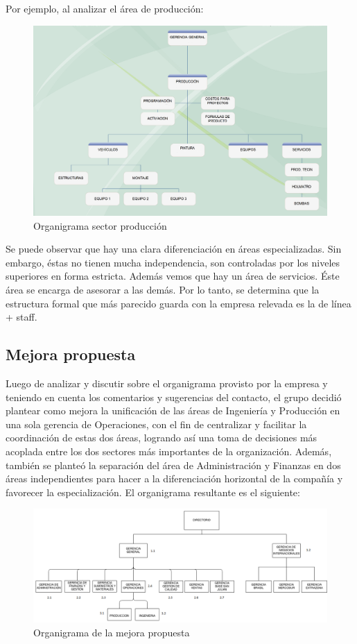 \documentclass[a4paper,10pt]{article}
\begin{document}
Por ejemplo, al analizar el área de producción:
	\begin{figure}[H]
		\centering
		\includegraphics[width=15cm]{imagenes/produccion.png}
		\caption{Organigrama sector producción}
	\end{figure}
Se puede observar que hay una clara diferenciación en áreas especializadas. Sin embargo, éstas no tienen mucha independencia, son controladas
por los niveles superiores en forma estricta. Además vemos que hay un área de servicios. Éste área se encarga de asesorar a las demás. Por lo tanto,
se determina que la estructura formal que más parecido guarda con la empresa relevada es la de línea + staff.
	
\subsection{Mejora propuesta}
	Luego de analizar y discutir sobre el organigrama provisto por la empresa y teniendo en cuenta los comentarios y sugerencias del contacto, el grupo decidió plantear como mejora la unificación de las áreas de Ingeniería y Producción en una sola gerencia de Operaciones, con el fin de centralizar y facilitar la coordinación de estas dos áreas, logrando así una toma de decisiones más acoplada entre los dos sectores más importantes de la organización. Además, también se planteó la separación del área de Administración y Finanzas en dos áreas independientes para hacer a la diferenciación horizontal  de la compañía y favorecer la especialización. El organigrama resultante es el siguiente:
	\begin{figure}[H]
		\centering
		\includegraphics[width=15cm]{imagenes/mejoraOrganigrama.png}
		\caption{Organigrama de la mejora propuesta}
	\end{figure}
\end{document}

